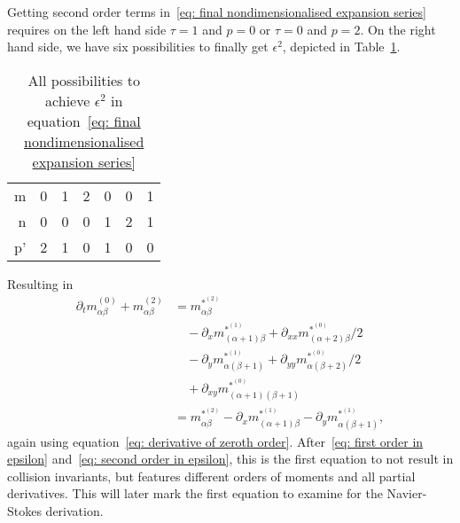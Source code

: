 Getting second order terms in~\eqref{eq: final nondimensionalised expansion series} requires on the left hand side $\tau=1$ and $p=0$ or $\tau=0$ and $p=2$.
On the right hand side, we have six possibilities to finally get $\epsilon^2$, depicted in Table~\ref{table: second order epsilon}.
\begin{table}[h]
  \centering
  \begin{tabular} {r || c | *{2}{c} | *{2}{c} | c}
    m  & 0 & 1 & 2 & 0 & 0 & 1 \\
    n  & 0 & 0 & 0 & 1 & 2 & 1 \\
    p' & 2 & 1 & 0 & 1 & 0 & 0
  \end{tabular}
  \caption{All possibilities to achieve $\epsilon^2$ in equation~\eqref{eq: final nondimensionalised expansion series}}
\label{table: second order epsilon}
\end{table}
Resulting in
\begin{equation}
  \label{eq: second order in epsilon}
  \begin{aligned}
    \partial_t m_{\alpha\beta}^{(0)} + m_{\alpha\beta}^{(2)}
    & =  m_{\alpha\beta}^{*^{(2)}} \\
    &\quad - \partial_x m_{(\alpha+1)\beta}^{*^{(1)}} + \partial_{xx} m_{(\alpha+2)\beta}^{*^{(0)}}/2 \\
    &\quad - \partial_y m_{\alpha(\beta+1)}^{*^{(1)}} + \partial_{yy} m_{\alpha(\beta+2)}^{*^{(0)}}/2 \\
    &\quad + \partial_{xy} m_{(\alpha+1)(\beta+1)}^{*^{(0)}}\\
    & =  m_{\alpha\beta}^{*^{(2)}} - \partial_x m_{(\alpha+1)\beta}^{*^{(1)}} - \partial_y m_{\alpha(\beta+1)}^{*^{(1)}},
  \end{aligned}
\end{equation}
again using equation~\eqref{eq: derivative of zeroth order}.
After~\eqref{eq: first order in epsilon} and~\eqref{eq: second order in epsilon}, this is the first equation to not result in collision invariants, but features different orders of moments and all partial derivatives.
This will later mark the first equation to examine for the Navier-Stokes derivation.

